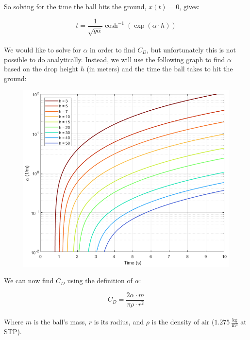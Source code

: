 \documentclass[a4paper]{article}
\begin{document}
	So solving for the time the ball hits the ground, $ x(t) = 0 $, gives:
	
	\begin{equation}
		t = \frac{1}{\sqrt{g \alpha}} \cosh^{-1} \left( \exp \left( \alpha \cdot h \right) \right)
	\end{equation}\\
	
	We would like to solve for $ \alpha $ in order to find $ C_D $, but unfortunately this is not possible to do analytically. Instead, we will use the following graph to find $ \alpha $ based on the drop height $ h $ (in meters) and the time the ball takes to hit the ground:
	
	\begin{figure}[H]
		\centering
		\includegraphics[width=\linewidth]{projectile_drag}
	\end{figure}
	
	We can now find $ C_D $ using the definition of $ \alpha $:
	
	\begin{equation}
		C_D = \frac{2\alpha \cdot m}{\pi \rho \cdot r^2}
	\end{equation}\\
	
	Where $ m $ is the ball's mass, $ r $ is its radius, and $ \rho $ is the density of air ($ 1.275\ \frac{\text{kg}}{\text{m}^3} $ at STP).
	
	
	
\end{document}
